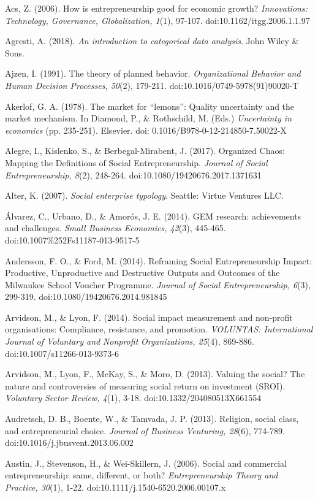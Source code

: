 \documentclass{article}
\begin{document}
Acs, Z. (2006). How is entrepreneurship good for economic growth? \emph{Innovations: Technology, Governance, Globalization, 1}(1), 97-107. doi:10.1162/itgg.2006.1.1.97

Agresti, A. (2018). \emph{An introduction to categorical data analysis}. John Wiley \& Sons.

Ajzen, I. (1991). The theory of planned behavior. \emph{Organizational }\emph{Behavior}\emph{ and Human Decision Processes, 50}(2), 179-211. doi:10.1016/0749-5978(91)90020-T

Akerlof, G. A. (1978). The market for “lemons”: Quality uncertainty and the market mechanism. In Diamond, P., \& Rothschild, M. (Eds.) \emph{Uncertainty in economics }(pp. 235-251). Elsevier. doi: 0.1016/B978-0-12-214850-7.50022-X

Alegre, I., Kislenko, S., \& Berbegal-Mirabent, J. (2017). Organized Chaos: Mapping the Definitions of Social Entrepreneurship. \emph{Journal of Social Entrepreneurship, 8}(2), 248-264. doi:10.1080/19420676.2017.1371631

Alter, K. (2007). \emph{Social enterprise typology}. Seattle: Virtue Ventures LLC. 

Álvarez, C., Urbano, D., \& Amorós, J. E. (2014). GEM research: achievements and challenges. \emph{Small Business Economics, 42}(3), 445-465. doi:10.1007\%252Fs11187-013-9517-5

Andersson, F. O., \& Ford, M. (2014). Reframing Social Entrepreneurship Impact: Productive, Unproductive and Destructive Outputs and Outcomes of the Milwaukee School Voucher Programme. \emph{Journal of Social Entrepreneurship, 6}(3), 299-319. doi:10.1080/19420676.2014.981845

Arvidson, M., \& Lyon, F. (2014). Social impact measurement and non-profit organisations: Compliance, resistance, and promotion. \emph{VOLUNTAS: International Journal of Voluntary and }\emph{Nonprofit}\emph{ Organizations, 25}(4), 869-886. doi:10.1007/s11266-013-9373-6

Arvidson, M., Lyon, F., McKay, S., \& Moro, D. (2013). Valuing the social? The nature and controversies of measuring social return on investment (SROI). \emph{Voluntary Sector Review, 4}(1), 3-18. doi:10.1332/204080513X661554

Audretsch, D. B., Boente, W., \& Tamvada, J. P. (2013). Religion, social class, and entrepreneurial choice. \emph{Journal of Business Venturing, 28}(6), 774-789. doi:10.1016/j.jbusvent.2013.06.002

Austin, J., Stevenson, H., \& Wei-Skillern, J. (2006). Social and commercial entrepreneurship: same, different, or both? \emph{Entrepreneurship Theory and Practice, 30}(1), 1-22. doi:10.1111/j.1540-6520.2006.00107.x
\end{document}
